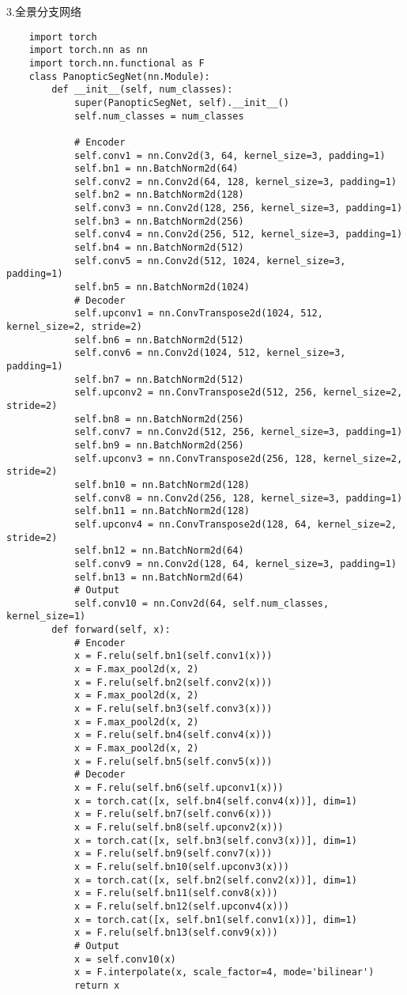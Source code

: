 3.全景分支网络
\begin{lstlisting}
    import torch
    import torch.nn as nn
    import torch.nn.functional as F
    class PanopticSegNet(nn.Module):
        def __init__(self, num_classes):
            super(PanopticSegNet, self).__init__()
            self.num_classes = num_classes
            
            # Encoder
            self.conv1 = nn.Conv2d(3, 64, kernel_size=3, padding=1)
            self.bn1 = nn.BatchNorm2d(64)
            self.conv2 = nn.Conv2d(64, 128, kernel_size=3, padding=1)
            self.bn2 = nn.BatchNorm2d(128)
            self.conv3 = nn.Conv2d(128, 256, kernel_size=3, padding=1)
            self.bn3 = nn.BatchNorm2d(256)
            self.conv4 = nn.Conv2d(256, 512, kernel_size=3, padding=1)
            self.bn4 = nn.BatchNorm2d(512)
            self.conv5 = nn.Conv2d(512, 1024, kernel_size=3, padding=1)
            self.bn5 = nn.BatchNorm2d(1024)
            # Decoder
            self.upconv1 = nn.ConvTranspose2d(1024, 512, kernel_size=2, stride=2)
            self.bn6 = nn.BatchNorm2d(512)
            self.conv6 = nn.Conv2d(1024, 512, kernel_size=3, padding=1)
            self.bn7 = nn.BatchNorm2d(512)
            self.upconv2 = nn.ConvTranspose2d(512, 256, kernel_size=2, stride=2)
            self.bn8 = nn.BatchNorm2d(256)
            self.conv7 = nn.Conv2d(512, 256, kernel_size=3, padding=1)
            self.bn9 = nn.BatchNorm2d(256)
            self.upconv3 = nn.ConvTranspose2d(256, 128, kernel_size=2, stride=2)
            self.bn10 = nn.BatchNorm2d(128)
            self.conv8 = nn.Conv2d(256, 128, kernel_size=3, padding=1)
            self.bn11 = nn.BatchNorm2d(128)
            self.upconv4 = nn.ConvTranspose2d(128, 64, kernel_size=2, stride=2)
            self.bn12 = nn.BatchNorm2d(64)
            self.conv9 = nn.Conv2d(128, 64, kernel_size=3, padding=1)
            self.bn13 = nn.BatchNorm2d(64)
            # Output
            self.conv10 = nn.Conv2d(64, self.num_classes, kernel_size=1)
        def forward(self, x):
            # Encoder
            x = F.relu(self.bn1(self.conv1(x)))
            x = F.max_pool2d(x, 2)
            x = F.relu(self.bn2(self.conv2(x)))
            x = F.max_pool2d(x, 2)
            x = F.relu(self.bn3(self.conv3(x)))
            x = F.max_pool2d(x, 2)
            x = F.relu(self.bn4(self.conv4(x)))
            x = F.max_pool2d(x, 2)
            x = F.relu(self.bn5(self.conv5(x)))
            # Decoder
            x = F.relu(self.bn6(self.upconv1(x)))
            x = torch.cat([x, self.bn4(self.conv4(x))], dim=1)
            x = F.relu(self.bn7(self.conv6(x)))
            x = F.relu(self.bn8(self.upconv2(x)))
            x = torch.cat([x, self.bn3(self.conv3(x))], dim=1)
            x = F.relu(self.bn9(self.conv7(x)))
            x = F.relu(self.bn10(self.upconv3(x)))
            x = torch.cat([x, self.bn2(self.conv2(x))], dim=1)
            x = F.relu(self.bn11(self.conv8(x)))
            x = F.relu(self.bn12(self.upconv4(x)))
            x = torch.cat([x, self.bn1(self.conv1(x))], dim=1)
            x = F.relu(self.bn13(self.conv9(x)))
            # Output
            x = self.conv10(x)
            x = F.interpolate(x, scale_factor=4, mode='bilinear')
            return x
\end{lstlisting}

